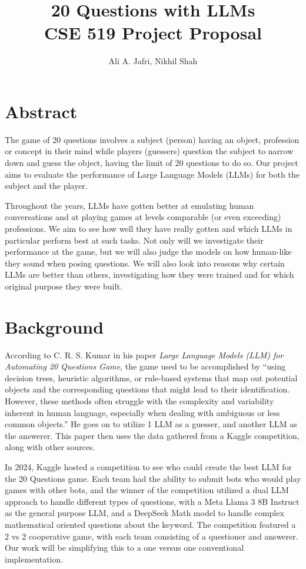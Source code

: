 \documentclass[10pt]{article}
\title{\textbf{20 Questions with LLMs}\\[0.5em]
\large CSE 519 Project Proposal}
\author{Ali A. Jafri, Nikhil Shah}
\date{}
\begin{document}
\maketitle

\section{Abstract}

The game of 20 questions involves a subject (person) having an object,
profession or concept in their mind while players (guessers) question the
subject to narrow down and guess the object, having the limit of 20 questions
to do so. Our project aims to evaluate the performance of Large Language Models
(LLMs) for both the subject and the player.

Throughout the years, LLMs have gotten better at emulating human conversations
and at playing games at levels comparable (or even exceeding) professions. We
aim to see how well they have really gotten and which LLMs in particular
perform best at such tasks. Not only will we investigate their performance at
the game, but we will also judge the models on how human-like they sound when
posing questions. We will also look into reasons why certain LLMs are better
than others, investigating how they were trained and for which original purpose
they were built.

\section{Background}

According to C. R. S. Kumar in his paper \textit{Large Language Models (LLM)
for Automating 20 Questions Game}, the game used to be accomplished by ``using
decision trees, heuristic algorithms, or rule-based systems that map out
potential objects and the corresponding questions that might lead to their
identification. However, these methods often struggle with the complexity and
variability inherent in human language, especially when dealing with ambiguous
or less common objects.'' He goes on to utilize 1 LLM as a guesser, and another
LLM as the answerer. This paper then uses the data gathered from a Kaggle
competition, along with other sources.

In 2024, Kaggle hosted a competition to see who could create the best LLM for
the 20 Questions game. Each team had the ability to submit bots who would play
games with other bots, and the winner of the competition utilized a dual LLM
approach to handle different types of questions, with a Meta Llama 3 8B
Instruct as the general purpose LLM, and a DeepSeek Math model to handle
complex mathematical oriented questions about the keyword. The competition
featured a 2 vs 2 cooperative game, with each team consisting of a questioner
and answerer. Our work will be simplifying this to a one versus one
conventional implementation.
\end{document}
